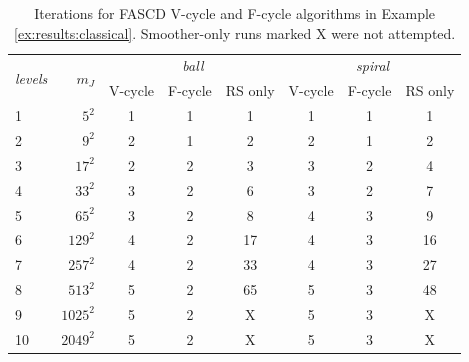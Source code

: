 \documentclass[letterpaper,final,12pt,reqno]{amsart}
\theoremstyle{cstyle}
\theoremstyle{cstyle*}
\theoremstyle{dstyle}
\numberwithin{equation}{section}
\numberwithin{figure}{section}
\numberwithin{table}{section}
\numberwithin{theorem}{section}
\newcommand{\XX}{{\sffamily X}}
\begin{document}
\begin{table}[ht]
\begin{tabular}{lr@{\hskip 7mm}cccccc}
\multirow{2}{*}{\emph{levels}} & \multirow{2}{*}{$m_J$} & \multicolumn{3}{c}{\,\emph{ball}} & \multicolumn{3}{c}{\,\emph{spiral}} \\ \cmidrule(lr){3-5} \cmidrule(lr){6-8}
   &          & V-cycle & F-cycle & RS only & V-cycle & F-cycle & RS only \\ \cmidrule{1-8}
 1 &    $5^2$ &  1 &  1 &  1  &  1 &  1 &  1 \\
 2 &    $9^2$ &  2 &  1 &  2  &  2 &  1 &  2 \\
 3 &   $17^2$ &  2 &  2 &  3  &  3 &  2 &  4 \\
 4 &   $33^2$ &  3 &  2 &  6  &  3 &  2 &  7 \\
 5 &   $65^2$ &  3 &  2 &  8  &  4 &  3 &  9 \\
 6 &  $129^2$ &  4 &  2 & 17  &  4 &  3 & 16 \\
 7 &  $257^2$ &  4 &  2 & 33  &  4 &  3 & 27 \\
 8 &  $513^2$ &  5 &  2 & 65  &  5 &  3 & 48 \\
 9 & $1025^2$ &  5 &  2 & \XX &  5 &  3 & \XX \\
10 & $2049^2$ &  5 &  2 & \XX &  5 &  3 & \XX
\end{tabular}
\bigskip
\caption{Iterations for FASCD V-cycle and F-cycle algorithms in Example \ref{ex:results:classical}.  Smoother-only runs marked \XX\xspace were not attempted.}
\label{tab:results:classical}
\end{table}
\end{document}
